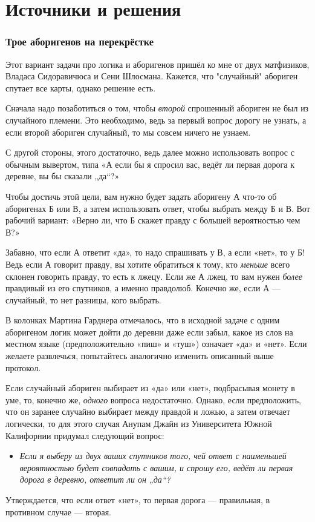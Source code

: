\section*{Источники и решения}

\subsubsection*{Трое аборигенов на перекрёстке}

Этот вариант задачи про логика и аборигенов пришёл ко мне от двух матфизиков, Владаса Сидоравичюса и Сени Шлосмана.
Кажется, что "случайный" абориген спутает все карты, однако решение есть.

Сначала надо позаботиться о том, чтобы \emph{второй} спрошенный абориген не был из случайного племени.
Это необходимо, ведь за первый вопрос дорогу не узнать, а если второй абориген случайный, то мы совсем ничего не узнаем.

С другой стороны, этого достаточно, ведь далее можно использовать вопрос с обычным вывертом, типа «А если бы я спросил вас, ведёт ли первая дорога к деревне, вы бы сказали „да“?»

Чтобы достичь этой цели, вам нужно будет задать аборигену А что-то об аборигенах Б или В, а затем использовать ответ, чтобы выбрать между Б и В.
Вот рабочий вариант: «Верно ли, что Б скажет правду с большей вероятностью чем В?»

Забавно, что если А ответит «да», то надо спрашивать у В, а если «нет», то у Б!
Ведь если А говорит правду, вы хотите обратиться к тому, кто \emph{меньше} всего склонен говорить правду, то есть к лжецу.
Если же А лжец, то вам нужен \emph{более} правдивый из его спутников, а именно правдолюб.
Конечно же, если А --- случайный, то нет разницы, кого выбрать.

В колонках Мартина Гарднера отмечалось, что в исходной задаче с одним аборигеном логик может дойти до деревни даже если забыл, какое из слов на местном языке (предположительно «пиш» и «туш») означает «да» и «нет».
Если желаете развлечься, попытайтесь аналогично изменить описанный выше протокол.

Если случайный абориген выбирает из «да» или «нет», подбрасывая монету в уме, то, конечно же, \emph{одного} вопроса недостаточно.
Однако, если предположить, что он заранее случайно выбирает между правдой и ложью, а затем отвечает логически,
то для этого случая Анупам Джайн из Университета Южной Калифорнии придумал следующий вопрос:
\begin{itemize}
 \item[] \emph{Если я выберу из двух ваших спутников того, чей ответ с наименьшей вероятностью будет совпадать с вашим, и спрошу его, ведёт ли первая дорога в деревню, ответит ли он „да“?}
\end{itemize}
Утверждается, что если ответ «нет», то первая дорога --- правильная, в противном случае --- вторая.


